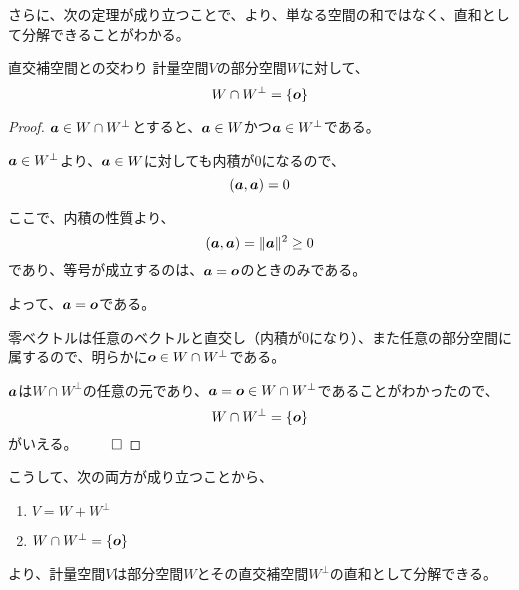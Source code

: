 \documentclass[../../../topic_linear-algebra]{subfiles}
\begin{document}
\br

さらに、次の定理が成り立つことで、より、単なる空間の和ではなく、直和として分解できることがわかる。

\begin{theorem*}{直交補空間との交わり}
  計量空間$V$の部分空間$W$に対して、
  \begin{equation*}
    W \cap W^\perp = \{ \vb*{o} \}
  \end{equation*}
\end{theorem*}

\begin{proof}
  $\vb*{a} \in W \cap W^\perp$とすると、$\vb*{a} \in W$かつ$\vb*{a} \in W^\perp$である。

  $\vb*{a} \in W^\perp$より、$\vb*{a} \in W$に対しても内積が0になるので、
  \begin{equation*}
    (\vb*{a}, \vb*{a}) = 0
  \end{equation*}

  ここで、内積の性質より、
  \begin{equation*}
    (\vb*{a}, \vb*{a}) = \| \vb*{a} \|^2 \geq 0
  \end{equation*}
  であり、等号が成立するのは、$\vb*{a} = \vb*{o}$のときのみである。

  よって、$\vb*{a} = \vb*{o}$である。

  \br

  零ベクトルは任意のベクトルと直交し（内積が0になり）、また任意の部分空間に属するので、明らかに$\vb*{o} \in W \cap W^\perp$である。

  \br

  $\vb*{a}$は$W \cap W^\perp$の任意の元であり、$\vb*{a} = \vb*{o} \in W \cap W^\perp$であることがわかったので、
  \begin{equation*}
    W \cap W^\perp = \{ \vb*{o} \}
  \end{equation*}
  がいえる。 $\qed$
\end{proof}

\br

こうして、次の両方が成り立つことから、
\begin{enumerate}[label=\romanlabel]
  \item $V = W + W^\perp$
  \item $W \cap W^\perp = \{ \vb*{o} \}$
\end{enumerate}
より、計量空間$V$は部分空間$W$とその直交補空間$W^\perp$の直和として分解できる。

\br
\end{document}
